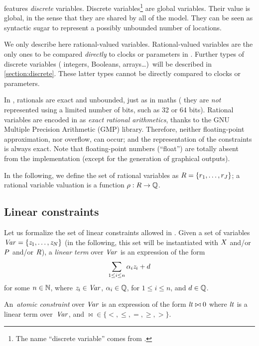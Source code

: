 \imitator{} features \emph{discrete} variables.
%
Discrete variables\footnote{%
	The name ``discrete variable'' comes from \hytech{}.
}
are global variables.
Their value is global, in the sense that they are shared by all \IPTA{} of the model.
They can be seen as syntactic sugar to represent a possibly unbounded number of locations.

We only describe here rational-valued variables.
Rational-valued variables are the only ones to be compared \emph{directly} to clocks or parameters in \imitator{}.
Further types of discrete variables (\eg{} integers, Booleans, arrays…)\ will be described in \cref{section:discrete}.
These latter types cannot be directly compared to clocks or parameters.

In \imitator{}, rationals are exact and unbounded, just as in maths (\ie{} they are \emph{not} represented using a limited number of bits, such as 32 or 64 bits).
%
Rational variables are encoded in \imitator{} as \emph{exact rational arithmetics}, thanks to the GNU Multiple Precision Arithmetic (GMP) library.
Therefore, neither floating-point approximation, nor overflow, can occur;
%
and the representation of the constraints is always exact.
Note that floating-point numbers (``float'') are totally absent from the \imitator{} implementation (except for the generation of graphical outputs).

In the following, we define the set of rational variables as $R = \{ r_1, \dots, r_J \} $;
a rational variable valuation is a function $\rho : R \rightarrow \mathbb Q$.



\subsection{Linear constraints}\label{ss:constraints}

Let us formalize the set of linear constraints allowed in \imitator{}.
Given a set of variables~$\mathit{Var} = \{ \mathit{z}_1, \dots, \mathit{z}_N \}$ (in the following, this set will be instantiated with $X$ and/or $P$ and/or $R$), a \emph{linear term} over $\mathit{Var}$ is an expression of the form
$$
	\sum_{1 \leq i \leq n} \alpha_i \mathit{z}_i + d
$$
for some $n \in \mathbb N$,
where
$\mathit{z}_{i} \in \mathit{Var}$,
$\alpha_{i} \in \mathbb Q$, for $1 \leq i \leq n$,
and
$d \in \mathbb Q$.

An~\emph{atomic constraint} over $\mathit{Var}$ is an expression of the form
$
	\mathit{lt} \bowtie 0
$
where
$\mathit{lt}$ is a linear term over~$\mathit{Var}$,
and
${\bowtie} \in \{ <, \leq, =, \geq, > \}$.

